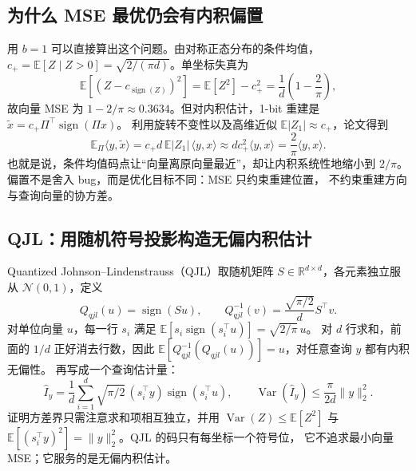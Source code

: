 \subsection{为什么 MSE 最优仍会有内积偏置}

用 $b=1$ 可以直接算出这个问题。由对称正态分布的条件均值，
$c_+=\mathbb E[Z\mid Z>0]=\sqrt{2/(\pi d)}$。单坐标失真为
\begin{equation}
  \mathbb E[(Z-c_{\operatorname{sign}(Z)})^2]
  =\mathbb E[Z^2]-c_+^2=\frac1d\left(1-\frac2\pi\right),
  \label{eq:38-tq-1bit-mse}
\end{equation}
故向量 MSE 为 $1-2/\pi\approx0.3634$。但对内积估计，1-bit 重建是
$\widetilde x=c_+\Pi^{\top}\operatorname{sign}(\Pi x)$。
利用旋转不变性以及高维近似 $\mathbb E|Z_1|\approx c_+$，论文得到
\begin{equation}
  \mathbb E_\Pi\langle y,\widetilde x\rangle
  =c_+d\,\mathbb E|Z_1|\,\langle y,x\rangle
  \approx d c_+^2\langle y,x\rangle
  =\frac2\pi\langle y,x\rangle.
  \label{eq:38-tq-bias}
\end{equation}
也就是说，条件均值码点让“向量离原向量最近”，却让内积系统性地缩小到
$2/\pi$。偏置不是舍入 bug，而是优化目标不同：MSE 只约束重建位置，
不约束重建方向与查询向量的协方差。

\subsection{QJL：用随机符号投影构造无偏内积估计}

Quantized Johnson--Lindenstrauss（QJL）取随机矩阵
$S\in\mathbb R^{d\times d}$，各元素独立服从 $\mathcal N(0,1)$，定义
\begin{equation}
  Q_{qjl}(u)=\operatorname{sign}(Su),\qquad
  Q_{qjl}^{-1}(v)=\frac{\sqrt{\pi/2}}dS^{\top}v.
  \label{eq:38-tq-qjl}
\end{equation}
对单位向量 $u$，每一行 $s_i$ 满足
$\mathbb E[s_i\operatorname{sign}(s_i^{\top}u)]=\sqrt{2/\pi}\,u$。
对 $d$ 行求和，前面的 $1/d$ 正好消去行数，因此
$\mathbb E[Q_{qjl}^{-1}(Q_{qjl}(u))]=u$，对任意查询 $y$ 都有内积无偏性。
再写成一个查询估计量：
\begin{equation}
  \widehat I_y=\frac1d\sum_{i=1}^{d}\sqrt{\pi/2}\,
  (s_i^{\top}y)\operatorname{sign}(s_i^{\top}u),\qquad
  \operatorname{Var}(\widehat I_y)
  \le\frac{\pi}{2d}\|y\|_2^2.
  \label{eq:38-tq-qjl-var}
\end{equation}
证明方差界只需注意求和项相互独立，并用
$\operatorname{Var}(Z)\le\mathbb E[Z^2]$ 与
$\mathbb E[(s_i^{\top}y)^2]=\|y\|_2^2$。QJL 的码只有每坐标一个符号位，
它不追求最小向量 MSE；它服务的是无偏内积估计。

